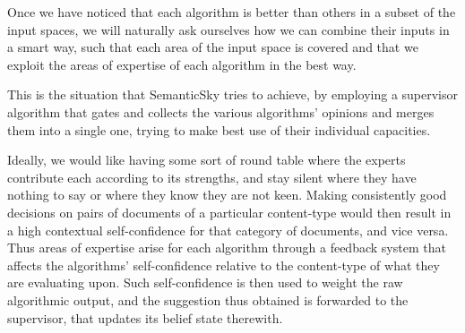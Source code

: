\documentclass[11pt]{article}
\begin{document}
Once we have noticed that each algorithm is better than others in a subset of the input spaces, we will naturally ask ourselves how we can combine their inputs in a smart way, such that each area of the input space is covered and that we exploit the areas of expertise of each algorithm in the best way. 

This is the situation that SemanticSky tries to achieve, by employing a supervisor algorithm that gates and collects the various algorithms' opinions and merges them into a single one, trying to make best use of their individual capacities.

Ideally, we would like having some sort of round table where the experts contribute each according to its strengths, and stay silent where they have nothing to say or where they know they are not keen. Making consistently good decisions on pairs of documents of a particular content-type would then result in a high contextual self-confidence for that category of documents, and vice versa. Thus areas of expertise arise for each algorithm through a feedback system that affects the algorithms' self-confidence relative to the content-type of what they are evaluating upon. Such self-confidence is then used to weight the raw algorithmic output, and the suggestion thus obtained is forwarded to the supervisor, that updates its belief state therewith.
\end{document}
